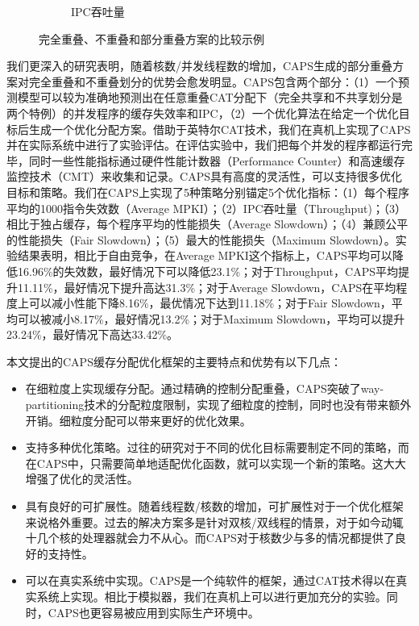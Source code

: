 \begin{figure}[htbp]
\begin{subfigure}[b]{0.4\linewidth}
        \caption{IPC吞吐量}
    \end{subfigure}
    \caption{完全重叠、不重叠和部分重叠方案的比较示例}
    \label{fig:illustration}
\end{figure}

我们更深入的研究表明，随着核数/并发线程数的增加，CAPS生成的部分重叠方案对完全重叠和不重叠划分的优势会愈发明显。CAPS包含两个部分：（1）一个预测模型可以较为准确地预测出在任意重叠CAT分配下（完全共享和不共享划分是两个特例）的并发程序的缓存失效率和IPC，（2）一个优化算法在给定一个优化目标后生成一个优化分配方案。借助于英特尔CAT技术，我们在真机上实现了CAPS并在实际系统中进行了实验评估。在评估实验中，我们把每个并发的程序都运行完毕，同时一些性能指标通过硬件性能计数器（Performance Counter）和高速缓存监控技术（CMT）来收集和记录。CAPS具有高度的灵活性，可以支持很多优化目标和策略。我们在CAPS上实现了5种策略分别锚定5个优化指标：（1）每个程序平均的1000指令失效数（Average MPKI）；（2）IPC吞吐量（Throughput)；（3）相比于独占缓存，每个程序平均的性能损失（Average Slowdown）；（4）兼顾公平的性能损失（Fair Slowdown）；（5）最大的性能损失（Maximum Slowdown）。实验结果表明，相比于自由竞争，在Average MPKI这个指标上，CAPS平均可以降低16.96\%的失效数，最好情况下可以降低23.1\%；对于Throughput，CAPS平均提升11.11\%，最好情况下提升高达31.3\%；对于Average Slowdown，CAPS在平均程度上可以减小性能下降8.16\%，最优情况下达到11.18\%；对于Fair Slowdown，平均可以被减小8.17\%，最好情况13.2\%；对于Maximum Slowdown，平均可以提升23.24\%，最好情况下高达33.42\%。

本文提出的CAPS缓存分配优化框架的主要特点和优势有以下几点：

\begin{itemize}
    \item 在细粒度上实现缓存分配。通过精确的控制分配重叠，CAPS突破了way-partitioning技术的分配粒度限制，实现了细粒度的控制，同时也没有带来额外开销。细粒度分配可以带来更好的优化效果。
    \item 支持多种优化策略。过往的研究对于不同的优化目标需要制定不同的策略，而在CAPS中，只需要简单地适配优化函数，就可以实现一个新的策略。这大大增强了优化的灵活性。
    \item 具有良好的可扩展性。随着线程数/核数的增加，可扩展性对于一个优化框架来说格外重要。过去的解决方案多是针对双核/双线程的情景，对于如今动辄十几个核的处理器就会力不从心。而CAPS对于核数少与多的情况都提供了良好的支持性。
    \item 可以在真实系统中实现。CAPS是一个纯软件的框架，通过CAT技术得以在真实系统上实现。相比于模拟器，我们在真机上可以进行更加充分的实验。同时，CAPS也更容易被应用到实际生产环境中。
\end{itemize}

